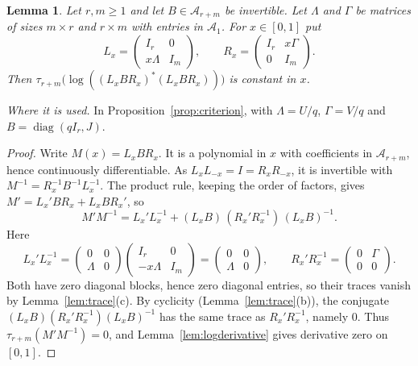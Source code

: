 \documentclass[11pt]{article}
\newtheorem{lemma}[theorem]{Lemma}
\theoremstyle{remark}
\numberwithin{equation}{section}
\newcommand{\diag}{\operatorname{diag}}
\begin{document}
\begin{lemma}\label{lem:shears}
Let $r,m\ge1$ and let $B\in\mathcal A_{r+m}$ be invertible.
Let $\Lambda$ and $\Gamma$ be matrices of sizes $m\times r$ and $r\times m$ with entries in $\mathcal A_1$. For $x\in[0,1]$ put
\[
 L_x=\begin{pmatrix}I_r&0\\x\Lambda&I_m\end{pmatrix},\qquad
 R_x=\begin{pmatrix}I_r&x\Gamma\\0&I_m\end{pmatrix}.
\]
Then $\tau_{r+m}\bigl(\log((L_xBR_x)^*(L_xBR_x))\bigr)$ is constant in $x$.
\end{lemma}

\noindent\emph{Where it is used.} In Proposition~\ref{prop:criterion}, with $\Lambda=U/q$, $\Gamma=V/q$ and $B=\diag(qI_r,J)$.

\begin{proof}
Write $M(x)=L_xBR_x$. It is a polynomial in $x$ with coefficients in $\mathcal A_{r+m}$, hence continuously differentiable. As $L_xL_{-x}=I=R_xR_{-x}$, it is invertible with $M^{-1}=R_x^{-1}B^{-1}L_x^{-1}$. The product rule, keeping the order of factors, gives $M'=L_x'BR_x+L_xBR_x'$, so
\[
 M'M^{-1}=L_x'L_x^{-1}
 +(L_xB)\,(R_x'R_x^{-1})\,(L_xB)^{-1}.
\]
Here
\[
 L_x'L_x^{-1}=\begin{pmatrix}0&0\\\Lambda&0\end{pmatrix}\begin{pmatrix}I_r&0\\-x\Lambda&I_m\end{pmatrix}=\begin{pmatrix}0&0\\\Lambda&0\end{pmatrix},
 \qquad
 R_x'R_x^{-1}=\begin{pmatrix}0&\Gamma\\0&0\end{pmatrix}.
\]
Both have zero diagonal blocks, hence zero diagonal entries, so their traces vanish by Lemma~\ref{lem:trace}(c). By cyclicity (Lemma~\ref{lem:trace}(b)), the conjugate $(L_xB)(R_x'R_x^{-1})(L_xB)^{-1}$ has the same trace as $R_x'R_x^{-1}$, namely $0$. Thus $\tau_{r+m}(M'M^{-1})=0$, and Lemma~\ref{lem:logderivative} gives derivative zero on $[0,1]$.
\end{proof}
\end{document}
